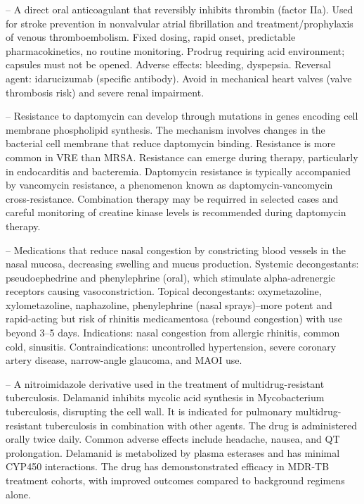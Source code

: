 -- A direct oral anticoagulant that reversibly inhibits thrombin (factor IIa). Used for stroke prevention in nonvalvular atrial fibrillation and treatment/prophylaxis of venous thromboembolism. Fixed dosing, rapid onset, predictable pharmacokinetics, no routine monitoring. Prodrug requiring acid environment; capsules must not be opened. Adverse effects: bleeding, dyspepsia. Reversal agent: idarucizumab (specific antibody). Avoid in mechanical heart valves (valve thrombosis risk) and severe renal impairment.

-- Resistance to daptomycin can develop through mutations in genes encoding cell membrane phospholipid synthesis. The mechanism involves changes in the bacterial cell membrane that reduce daptomycin binding. Resistance is more common in VRE than MRSA. Resistance can emerge during therapy, particularly in endocarditis and bacteremia. Daptomycin resistance is typically accompanied by vancomycin resistance, a phenomenon known as daptomycin-vancomycin cross-resistance. Combination therapy may be requirred in selected cases and careful monitoring of creatine kinase levels is recommended during daptomycin therapy.

-- Medications that reduce nasal congestion by constricting blood vessels in the nasal mucosa, decreasing swelling and mucus production. Systemic decongestants: pseudoephedrine and phenylephrine (oral), which stimulate alpha-adrenergic receptors causing vasoconstriction. Topical decongestants: oxymetazoline, xylometazoline, naphazoline, phenylephrine (nasal sprays)--more potent and rapid-acting but risk of rhinitis medicamentosa (rebound congestion) with use beyond 3--5 days. Indications: nasal congestion from allergic rhinitis, common cold, sinusitis. Contraindications: uncontrolled hypertension, severe coronary artery disease, narrow-angle glaucoma, and MAOI use.

-- A nitroimidazole derivative used in the treatment of multidrug-resistant tuberculosis. Delamanid inhibits mycolic acid synthesis in Mycobacterium tuberculosis, disrupting the cell wall. It is indicated for pulmonary multidrug-resistant tuberculosis in combination with other agents. The drug is administered orally twice daily. Common adverse effects include headache, nausea, and QT prolongation. Delamanid is metabolized by plasma esterases and has minimal CYP450 interactions. The drug has demonstonstrated efficacy in MDR-TB treatment cohorts, with improved outcomes compared to background regimens alone.

